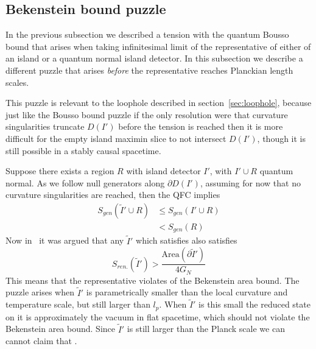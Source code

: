 \documentclass[a4paper,11pt]{article}
\newcommand{\cts}[1]{\ignorespaces}
\def\bne{\begin{equation}}
\def\ene{\end{equation}}
\newcommand{\del}{\partial}
\begin{document}

\subsection{Bekenstein bound puzzle} \label{sec:BekBoundViol}
In the previous subsection we described a tension with the quantum Bousso bound that arises when taking  infinitesimal limit of the representative of either of an island or a quantum normal island detector. In this subsection we describe a different puzzle that arises \textit{before} the representative reaches Planckian length scales. 

This puzzle is relevant to the loophole described in section~\ref{sec:loophole}, because just like the Bousso bound puzzle if the only resolution were that curvature singularities truncate $D(I')$ before the tension is reached then it is more difficult for the empty island maximin slice to not intersect $D(I')$, though it is still possible in a stably causal spacetime. 


Suppose there exists a region $R$ with island detector $I'$, with $I' \cup R$ quantum normal. As we follow null generators along $\del D(I')$, assuming for now that no  curvature singularities are reached, then the QFC implies 
\bne \begin{split} \label{eq:starteq} S_{gen} (\tilde I' \cup R) &\leq S_{gen} (I' \cup R)\\ &< S_{gen} (R) \end{split} \ene
Now in~\cite{Hartman2020} it was argued that any $\tilde{I}'$ which satisfies  also satisfies
\bne \label{eq:BekBekBound} S_{ren.} (\tilde{I}') > \frac{\text{Area}(\del \tilde{I}')}{4G_N} \ene
This means that the representative violates of the Bekenstein area bound. The puzzle arises when $\tilde{I}'$ is parametrically smaller than the local curvature and temperature scale, but still larger than $l_p$. When $\tilde{I}'$ is this small the reduced state on it is approximately the vacuum in flat spacetime, which should not violate the Bekenstein area bound. Since $\tilde I'$ is still larger than the Planck scale we can cannot claim that . 
\end{document}
